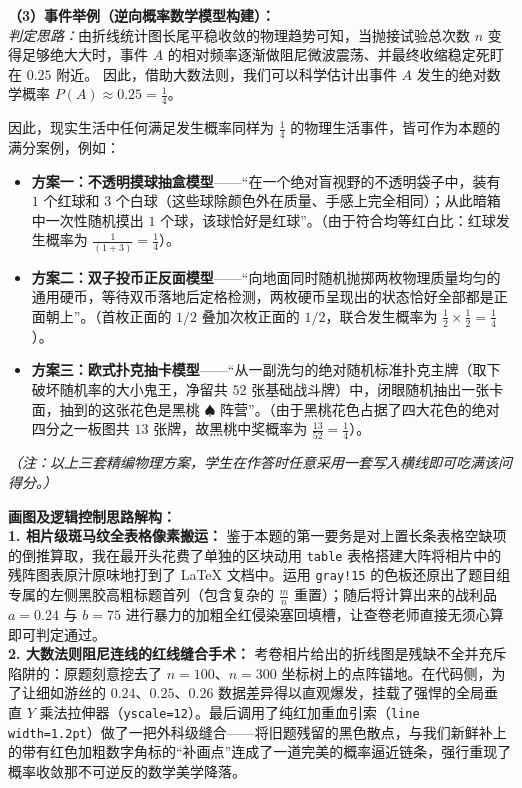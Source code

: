 \documentclass[12pt, a4paper]{ctexrep}
\begin{document}
\vspace{0.4cm}
\textbf{（3）事件举例（逆向概率数学模型构建）：} \\
\textit{判定思路：}由折线统计图长尾平稳收敛的物理趋势可知，当抛接试验总次数 $n$ 变得足够绝大大时，事件 $A$ 的相对频率逐渐做阻尼微波震荡、并最终收缩稳定死盯在 $0.25$ 附近。
因此，借助大数法则，我们可以科学估计出事件 $A$ 发生的绝对数学概率 $P(A) \approx 0.25 = \frac{1}{4}$。

因此，现实生活中任何满足发生概率同样为 $\frac{1}{4}$ 的物理生活事件，皆可作为本题的满分案例，例如：
\begin{itemize}
    \item \textbf{方案一：不透明摸球抽盒模型}——“在一个绝对盲视野的不透明袋子中，装有 $1$ 个红球和 $3$ 个白球（这些球除颜色外在质量、手感上完全相同）；从此暗箱中一次性随机摸出 $1$ 个球，该球恰好是红球”。（由于符合均等红白比：红球发生概率为 $\frac{1}{(1+3)} = \frac{1}{4}$）。
    \item \textbf{方案二：双子投币正反面模型}——“向地面同时随机抛掷两枚物理质量均匀的通用硬币，等待双币落地后定格检测，两枚硬币呈现出的状态恰好全部都是正面朝上”。（首枚正面的 $1/2$ 叠加次枚正面的 $1/2$，联合发生概率为 $\frac{1}{2} \times \frac{1}{2} = \frac{1}{4}$）。
    \item \textbf{方案三：欧式扑克抽卡模型}——“从一副洗匀的绝对随机标准扑克主牌（取下破坏随机率的大小鬼王，净留共 $52$ 张基础战斗牌）中，闭眼随机抽出一张卡面，抽到的这张花色是黑桃 $\spadesuit$ 阵营”。（由于黑桃花色占据了四大花色的绝对四分之一板图共 $13$ 张牌，故黑桃中奖概率为 $\frac{13}{52} = \frac{1}{4}$）。
\end{itemize}
\textit{（注：以上三套精编物理方案，学生在作答时任意采用一套写入横线即可吃满该问得分。）}

\vspace{0.4cm}
{\small\color{blue!70!black}
\textbf{画图及逻辑控制思路解构：}\\
\textbf{1. 相片级斑马纹全表格像素搬运：} 鉴于本题的第一要务是对上置长条表格空缺项的倒推算取，我在最开头花费了单独的区块动用 \texttt{table} 表格搭建大阵将相片中的残阵图表原汁原味地打到了 LaTeX 文档中。运用 \texttt{gray!15} 的色板还原出了题目组专属的左侧黑胶高粗标题首列（包含复杂的 $\frac{m}{n}$ 重置）；随后将计算出来的战利品 $a=0.24$ 与 $b=75$ 进行暴力的加粗全红侵染塞回填槽，让查卷老师直接无须心算即可判定通过。\\
\textbf{2. 大数法则阻尼连线的红线缝合手术：} 考卷相片给出的折线图是残缺不全并充斥陷阱的：原题刻意挖去了 $n=100$、$n=300$ 坐标树上的点阵锚地。在代码侧，为了让细如游丝的 $0.24、0.25、0.26$ 数据差异得以直观爆发，挂载了强悍的全局垂直 $Y$ 乘法拉伸器（\texttt{yscale=12}）。最后调用了纯红加重血引索（\texttt{line width=1.2pt}）做了一把外科级缝合——将旧题残留的黑色散点，与我们新鲜补上的带有红色加粗数字角标的“补画点”连成了一道完美的概率逼近链条，强行重现了概率收敛那不可逆反的数学美学降落。
}
\end{document}
